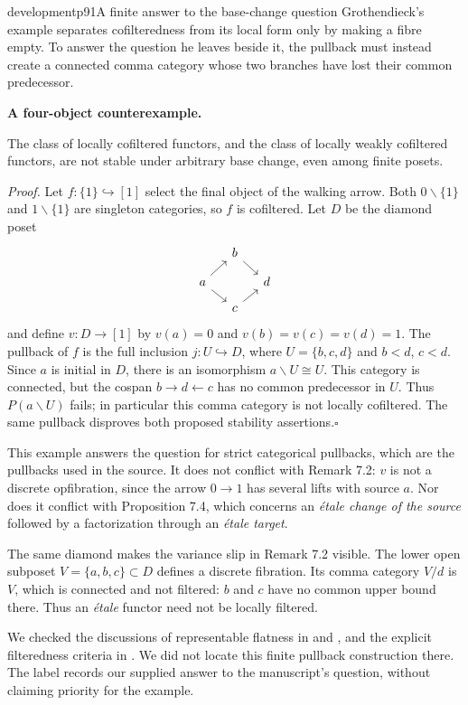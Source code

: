 \begin{dcomment}{development}{p91}{A finite answer to the base-change question}
Grothendieck's example separates cofilteredness from its local form only by making a fibre empty. To answer the question he leaves beside it, the pullback must instead create a connected comma category whose two branches have lost their common predecessor.

\noindent\textbf{A four-object counterexample.}\ours\par
The class of locally cofiltered functors, and the class of locally weakly cofiltered functors, are not stable under arbitrary base change, even among finite posets.

\emph{Proof.} Let $f:\{1\}\hookrightarrow[1]$ select the final object of the walking arrow. Both $0\backslash\{1\}$ and $1\backslash\{1\}$ are singleton categories, so $f$ is cofiltered. Let $D$ be the diamond poset
\[
\begin{tikzcd}[row sep=small,column sep=small]
 & b\arrow[dr] & \\
a\arrow[ur]\arrow[dr] & & d\\
 & c\arrow[ur] &
\end{tikzcd}
\]
and define $v:D\to[1]$ by $v(a)=0$ and $v(b)=v(c)=v(d)=1$. The pullback of $f$ is the full inclusion $j:U\hookrightarrow D$, where $U=\{b,c,d\}$ and $b<d$, $c<d$. Since $a$ is initial in $D$, there is an isomorphism $a\backslash U\cong U$. This category is connected, but the cospan $b\to d\leftarrow c$ has no common predecessor in $U$. Thus $P(a\backslash U)$ fails; in particular this comma category is not locally cofiltered. The same pullback disproves both proposed stability assertions.\hfill$\square$

This example answers the question for strict categorical pullbacks, which are the pullbacks used in the source. It does not conflict with Remark 7.2: $v$ is not a discrete opfibration, since the arrow $0\to1$ has several lifts with source $a$. Nor does it conflict with Proposition 7.4, which concerns an \emph{\'etale change of the source} followed by a factorization through an \emph{\'etale target}.

The same diamond makes the variance slip in Remark 7.2 visible. The lower open subposet $V=\{a,b,c\}\subset D$ defines a discrete fibration. Its comma category $V/d$ is $V$, which is connected and not filtered: $b$ and $c$ have no common upper bound there. Thus an \emph{\'etale} functor need not be locally filtered.

We checked the discussions of representable flatness in \citet[Remark 2.4]{Tendas2024} and \citet{Shulman2011Flat}, and the explicit filteredness criteria in \citet[Section 4.19]{StacksFiltered2026}. We did not locate this finite pullback construction there. The label records our supplied answer to the manuscript's question, without claiming priority for the example.
\end{dcomment}

